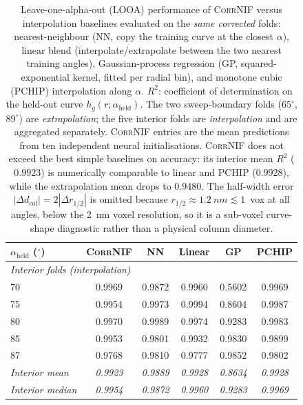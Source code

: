 \documentclass[aip,amsmath,amssymb,reprint]{revtex4-1}
\newcommand{\dang}{\ensuremath{\alpha}}
\begin{document}
\begin{table}[htbp]
  \centering
  \caption{%
    Leave-one-alpha-out (LOOA) performance of \textsc{CorrNIF} versus
    interpolation baselines evaluated on the \emph{same corrected} folds:
    nearest-neighbour (NN, copy the training curve at the closest $\dang$),
    linear blend (interpolate/extrapolate between the two nearest training
    angles), Gaussian-process regression (GP, squared-exponential kernel,
    fitted per radial bin), and monotone cubic (PCHIP) interpolation along
    $\dang$.
    $R^2$: coefficient of determination on the held-out curve
    $h_g(r;\dang_{\mathrm{held}})$.
    The two sweep-boundary folds ($65^{\circ}$, $89^{\circ}$) are
    \emph{extrapolation}; the five interior folds are \emph{interpolation}
    and are aggregated separately.
    \textsc{CorrNIF} entries are the mean predictions from ten independent
    neural initialisations.  \textsc{CorrNIF} does not exceed the best simple
    baselines on accuracy: its interior mean $R^2$ ($0.9923$) is numerically
    comparable to linear and PCHIP ($0.9928$), while the extrapolation mean
    drops to $0.9480$.  The half-width error
    $|\Delta d_{\mathrm{col}}| = 2|\Delta r_{1/2}|$ is omitted because
    $r_{1/2}\approx\SI{1.2}{nm}\lesssim 1$~vox at all angles, below the
    \SI{2}{nm} voxel resolution, so it is a sub-voxel curve-shape diagnostic
    rather than a physical column diameter.
  }
  \label{tab:looa}
  \begin{tabular}{lccccc}
    \toprule
    $\dang_{\mathrm{held}}$ ($^{\circ}$)
      & \textsc{CorrNIF}
      & NN
      & Linear
      & GP
      & PCHIP \\
    \midrule
    \multicolumn{6}{l}{\emph{Interior folds (interpolation)}}\\
    70 & 0.9969 & 0.9872 & 0.9960 & 0.5602 & 0.9969 \\
    75 & 0.9954 & 0.9973 & 0.9994 & 0.8604 & 0.9987 \\
    80 & 0.9970 & 0.9989 & 0.9974 & 0.9283 & 0.9983 \\
    85 & 0.9953 & 0.9801 & 0.9932 & 0.9830 & 0.9899 \\
    87 & 0.9768 & 0.9810 & 0.9777 & 0.9852 & 0.9802 \\
    \textit{Interior mean} & \textit{0.9923} & \textit{0.9889} & \textit{0.9928} & \textit{0.8634} & \textit{0.9928} \\
    \textit{Interior median} & \textit{0.9954} & \textit{0.9872} & \textit{0.9960} & \textit{0.9283} & \textit{0.9969} \\

\end{tabular}
\end{table}
\end{document}
